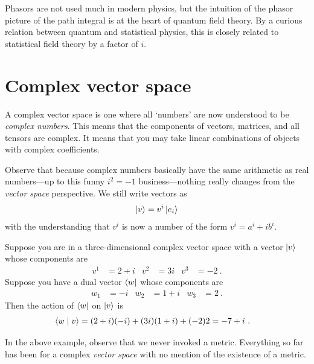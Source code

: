 \documentclass[12pt, oneside]{report}    %
\let\oldsection\section
\def\section{%
  \setcounter{sidenote}{1}%
  \oldsection
}
\begin{document}
Phasors are not used much in modern physics, but the intuition of the phasor picture of the path integral is at the heart of quantum field theory. By a curious relation between quantum and statistical physics, this is closely related to statistical field theory by a factor of $i$.



\section{Complex vector space}

A complex vector space is one where all `numbers' are now understood to be \emph{complex numbers}. This means that the components of vectors, matrices, and all tensors are complex. It means that you may take linear combinations of objects with complex coefficients. 

Observe that because complex numbers basically have the same arithmetic as real numbers---up to this funny $i^2=-1$ business---nothing really changes from the \emph{vector space} perspective. We still write vectors as
\begin{align}
    \left|v\right\rangle = v^i\left|e_i\right\rangle
\end{align}
with the understanding that $v^i$ is now a number of the form $v^i = a^i + i b^i$.
\begin{example}
Suppose you are in a three-dimensional  complex vector space with a vector $\left|v\right\rangle$ whose components are
\begin{align}
    v^1 &= 2+i
    &
    v^2 &= 3i
    &
    v^3 &= -2 \ .
\end{align}
Suppose you have a dual vector $\left\langle w\right|$ whose components are
\begin{align}
    w_1 &= -i
    &
    w_2 &= 1+i
    &
    w_3 &= 2 \ .
\end{align}
Then the action of $\left\langle w\right|$ on $\left|v\right\rangle$ is
\begin{align}
    \langle w \mid v \rangle &=
    (2+i)(-i)+(3i)(1+i)+(-2)2 
    =
    -7 + i
    \ . 
\end{align}
\end{example}


In the above example, observe that we never invoked a metric. Everything so far has been for a complex \emph{vector space} with no mention of the existence of a metric. 
\end{document}
